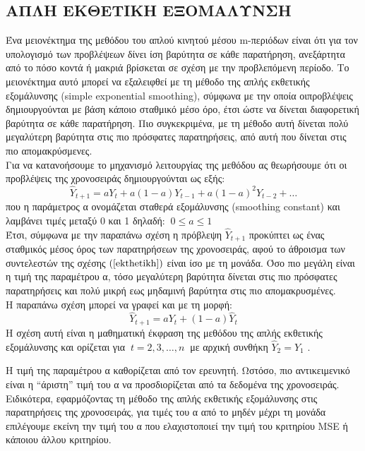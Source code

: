 \subsection{ ΑΠΛΗ ΕΚΘΕΤΙΚΗ ΕΞΟΜΑΛΥΝΣΗ}
Ένα μειονέκτημα της μεθόδου του απλού κινητού μέσου m-περιόδων είναι ότι για
τον υπολογισμό των προβλέψεων δίνει ίση βαρύτητα σε κάθε παρατήρηση,
ανεξάρτητα από το πόσο κοντά ή μακριά βρίσκεται σε σχέση με την προβλεπόμενη
περίοδο. Το μειονέκτημα αυτό μπορεί να εξαλειφθεί με τη μέθοδο της απλής
εκθετικής εξομάλυνσης (simple exponential smoothing), σύμφωνα με την οποία οιπροβλέψεις δημιουργούνται με βάση κάποιο σταθμικό μέσο όρο, έτσι ώστε να δίνεται
διαφορετική βαρύτητα σε κάθε παρατήρηση. Πιο συγκεκριμένα, με τη μέθοδο αυτή
δίνεται πολύ μεγαλύτερη βαρύτητα στις πιο πρόσφατες παρατηρήσεις, από αυτή που
δίνεται στις πιο απομακρύσμενες.\\
Για να κατανοήσουμε το μηχανισμό λειτουργίας της μεθόδου ας θεωρήσουμε ότι
οι προβλέψεις της χρονοσειράς δημιουργούνται ως εξής:\\
\begin{equation}
\label{ekthetikh}
 \widehat{Y}_{t + 1} = aY_t + a \left( 1 − a \right) Y_{t − 1} + a \left( 1 − a \right)^2 Y_{t − 2} + \dots 
\end{equation}
που η παράμετρος α ονομάζεται σταθερά εξομάλυνσης (smoothing constant) και
λαμβάνει τιμές μεταξύ 0 και 1 δηλαδή: $ \: 0\leq a\leq 1$\\

Έτσι, σύμφωνα με την παραπάνω σχέση η πρόβλεψη $\widehat{Y}_{t+1} $ προκύπτει ως ένας
σταθμικός μέσος όρος των παρατηρήσεων της χρονοσειράς, αφού το άθροισμα των
συντελεστών της σχέσης $\left(\ref{ekthetikh}\right) $ είναι ίσο με τη μονάδα. Όσο πιο μεγάλη είναι η τιμή της
παραμέτρου α, τόσο μεγαλύτερη βαρύτητα δίνεται στις πιο πρόσφατες παρατηρήσεις
και πολύ μικρή εως μηδαμινή βαρύτητα στις πιο απομακρυσμένες.\\
Η παραπάνω σχέση μπορεί να γραφεί και με τη μορφή:\\
$$ \widehat{Y}_{t + 1} = aY_t + \left( 1 − a \right) \widehat{Y}_t $$
Η σχέση αυτή είναι η μαθηματική έκφραση της μεθόδου της απλής εκθετικής
εξομάλυνσης και ορίζεται για $\:t=2,3,\ldots,n\:$ με αρχική συνθήκη $\widehat{Y}_2 = Y_1$ .

Η τιμή της παραμέτρου α καθορίζεται από τον ερευνητή. Ωστόσο, πιο
αντικειμενικό είναι η “άριστη” τιμή του α να προσδιορίζεται από τα δεδομένα της
χρονοσειράς. Ειδικότερα, εφαρμόζοντας τη μέθοδο της απλής εκθετικής εξομάλυνσης
στις παρατηρήσεις της χρονοσειράς, για τιμές του α από το μηδέν μέχρι τη μονάδα
επιλέγουμε εκείνη την τιμή του α που ελαχιστοποιεί την τιμή του κριτηρίου MSE ή
κάποιου άλλου κριτηρίου.

